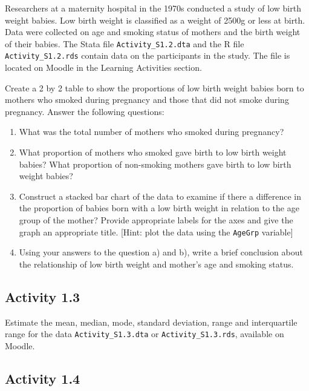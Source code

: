\documentclass[
  a4paper,
]{memoir}
\providecommand{\tightlist}{%
  \setlength{\itemsep}{0pt}\setlength{\parskip}{0pt}}\usepackage{longtable,booktabs,array}
\begin{document}
Researchers at a maternity hospital in the 1970s conducted a study of
low birth weight babies. Low birth weight is classified as a weight of
2500g or less at birth. Data were collected on age and smoking status of
mothers and the birth weight of their babies. The Stata file
\texttt{Activity\_S1.2.dta} and the R file \texttt{Activity\_S1.2.rds}
contain data on the participants in the study. The file is located on
Moodle in the Learning Activities section.

Create a 2 by 2 table to show the proportions of low birth weight babies
born to mothers who smoked during pregnancy and those that did not smoke
during pregnancy. Answer the following questions:

\begin{enumerate}
\def\labelenumi{\alph{enumi})}
\tightlist
\item
  What was the total number of mothers who smoked during pregnancy?
\item
  What proportion of mothers who smoked gave birth to low birth weight
  babies? What proportion of non-smoking mothers gave birth to low birth
  weight babies?
\item
  Construct a stacked bar chart of the data to examine if there a
  difference in the proportion of babies born with a low birth weight in
  relation to the age group of the mother? Provide appropriate labels
  for the axes and give the graph an appropriate title. {[}Hint: plot
  the data using the \texttt{AgeGrp} variable{]}
\item
  Using your answers to the question a) and b), write a brief conclusion
  about the relationship of low birth weight and mother's age and
  smoking status.
\end{enumerate}

\hypertarget{activity-1.3}{%
\subsection*{Activity 1.3}\label{activity-1.3}}

Estimate the mean, median, mode, standard deviation, range and
interquartile range for the data \texttt{Activity\_S1.3.dta} or
\texttt{Activity\_S1.3.rds}, available on Moodle.

\hypertarget{activity-1.4}{%
\subsection*{Activity 1.4}\label{activity-1.4}}
\end{document}
